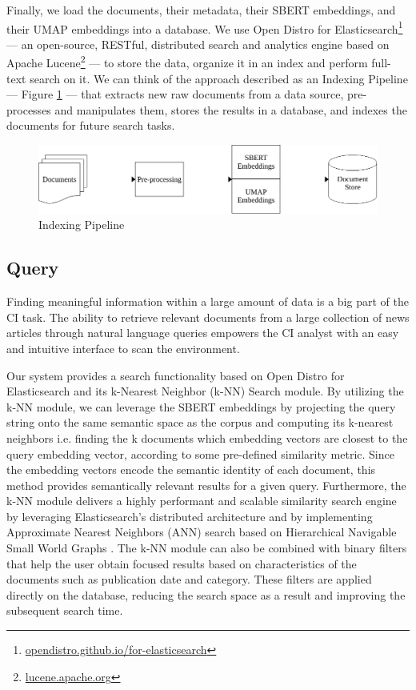 \documentclass[a4paper]{article}
\begin{document}
Finally, we load the documents, their metadata, their SBERT embeddings, and their UMAP embeddings into a database. We use Open Distro for Elasticsearch\footnote{\href{https://opendistro.github.io/for-elasticsearch/}{opendistro.github.io/for-elasticsearch}} — an open-source, RESTful, distributed search and analytics engine based on Apache Lucene\footnote{\href{https://lucene.apache.org/}{lucene.apache.org}} — to store the data, organize it in an index and perform full-text search on it. We can think of the approach described as an Indexing Pipeline — Figure \ref{indexing_pipeline} — that extracts new raw documents from a data source, pre-processes and manipulates them, stores the results in a database, and indexes the documents for future search tasks.

\begin{figure}[H]
	\centering
	\includegraphics[scale=0.7]{./figures/indexing_pipeline}
	\caption{Indexing Pipeline}
	\label{indexing_pipeline}
\end{figure}

\subsection*{Query}
Finding meaningful information within a large amount of data is a big part of the CI task. The ability to retrieve relevant documents from a large collection of news articles through natural language queries empowers the CI analyst with an easy and intuitive interface to scan the environment.

Our system provides a search functionality based on Open Distro for Elasticsearch and its k-Nearest Neighbor (k-NN) Search module. By utilizing the k-NN module, we can leverage the SBERT embeddings by projecting the query string onto the same semantic space as the corpus and computing its k-nearest neighbors i.e. finding the k documents which embedding vectors are closest to the query embedding vector, according to some pre-defined similarity metric. Since the embedding vectors encode the semantic identity of each document, this method provides semantically relevant results for a given query. Furthermore, the k-NN module delivers a highly performant and scalable similarity search engine by leveraging Elasticsearch’s distributed architecture and by implementing Approximate Nearest Neighbors (ANN) search based on Hierarchical Navigable Small World Graphs \citep{malkov2018}. The k-NN module can also be combined with binary filters that help the user obtain focused results based on characteristics of the documents such as publication date and category. These filters are applied directly on the database, reducing the search space as a result and improving the subsequent search time.
\end{document}
